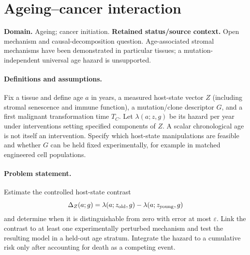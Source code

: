 \documentclass[11pt]{article}
\begin{document}
\section*{Ageing–cancer interaction}
\label{prob:253}
\label{rank:12}
\par\smallskip

\noindent\textbf{Domain.} Ageing; cancer initiation. \quad \textbf{Retained status/source context.} Open mechanism and causal-decomposition question. Age-associated stromal mechanisms have been demonstrated in particular tissues; a mutation-independent universal age hazard is unsupported.

\paragraph{Definitions and assumptions.} Fix a tissue and define age $a$ in years, a measured host-state vector $Z$ (including stromal senescence and immune function), a mutation/clone descriptor $G$, and a first malignant transformation time $T_C$. Let $\lambda(a;z,g)$ be its hazard per year under interventions setting specified components of $Z$. A scalar chronological age is not itself an intervention. Specify which host-state manipulations are feasible and whether $G$ can be held fixed experimentally, for example in matched engineered cell populations.

\paragraph{Problem statement.} Estimate the controlled host-state contrast
\[
\Delta_Z(a;g)=\lambda(a;z_{\rm old},g)-\lambda(a;z_{\rm young},g)
\]
and determine when it is distinguishable from zero with error at most $\varepsilon$. Link the contrast to at least one experimentally perturbed mechanism and test the resulting model in a held-out age stratum. Integrate the hazard to a cumulative risk only after accounting for death as a competing event.
\end{document}
